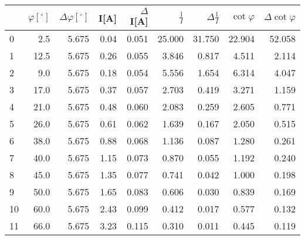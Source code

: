 \begin{tabular}{lrrrrrrrr}
\toprule
{} &  $\varphi[^\circ]$ &  $\Delta \varphi[^\circ]$ &  I[A] &  $\Delta$I[A] &  $\frac{1}{I}$ &  $\Delta \frac{1}{I}$ &  $\cot{\varphi}$ &  $\Delta \cot{\varphi}$ \\
\midrule
0  &                2.5 &                     5.675 &  0.04 &         0.051 &         25.000 &                31.750 &           22.904 &                  52.058 \\
1  &               12.5 &                     5.675 &  0.26 &         0.055 &          3.846 &                 0.817 &            4.511 &                   2.114 \\
2  &                9.0 &                     5.675 &  0.18 &         0.054 &          5.556 &                 1.654 &            6.314 &                   4.047 \\
3  &               17.0 &                     5.675 &  0.37 &         0.057 &          2.703 &                 0.419 &            3.271 &                   1.159 \\
4  &               21.0 &                     5.675 &  0.48 &         0.060 &          2.083 &                 0.259 &            2.605 &                   0.771 \\
5  &               26.0 &                     5.675 &  0.61 &         0.062 &          1.639 &                 0.167 &            2.050 &                   0.515 \\
6  &               38.0 &                     5.675 &  0.88 &         0.068 &          1.136 &                 0.087 &            1.280 &                   0.261 \\
7  &               40.0 &                     5.675 &  1.15 &         0.073 &          0.870 &                 0.055 &            1.192 &                   0.240 \\
8  &               45.0 &                     5.675 &  1.35 &         0.077 &          0.741 &                 0.042 &            1.000 &                   0.198 \\
9  &               50.0 &                     5.675 &  1.65 &         0.083 &          0.606 &                 0.030 &            0.839 &                   0.169 \\
10 &               60.0 &                     5.675 &  2.43 &         0.099 &          0.412 &                 0.017 &            0.577 &                   0.132 \\
11 &               66.0 &                     5.675 &  3.23 &         0.115 &          0.310 &                 0.011 &            0.445 &                   0.119 \\
\bottomrule
\end{tabular}
